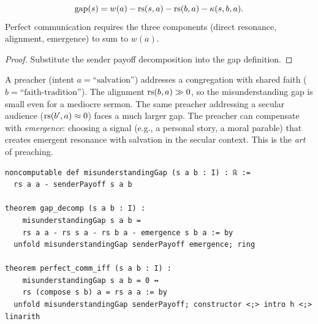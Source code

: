 \begin{theorem}
\label{thm:misunderstanding-emergence}
\[
\mathrm{gap}(s) = w(a) - \mathrm{rs}(s, a) - \mathrm{rs}(b, a) - \kappa(s, b, a).
\]
Perfect communication requires the three components (direct resonance,
alignment, emergence) to sum to $w(a)$.
\end{theorem}

\begin{proof}
Substitute the sender payoff decomposition into the gap definition.
\end{proof}

\begin{example}
A preacher (intent $a = \text{``salvation''}$) addresses a congregation with
shared faith ($b = \text{``faith-tradition''}$). The alignment
$\mathrm{rs}(b, a) \gg 0$, so the misunderstanding gap is small even for a mediocre
sermon. The same preacher addressing a secular audience
($\mathrm{rs}(b', a) \approx 0$) faces a much larger gap. The preacher can
compensate with \emph{emergence}: choosing a signal (e.g., a personal
story, a moral parable) that creates emergent resonance with salvation
in the secular context. This is the \emph{art} of preaching.
\end{example}

\begin{lstlisting}[caption={Lean 4: Misunderstanding gap}]
noncomputable def misunderstandingGap (s a b : I) : ℝ :=
  rs a a - senderPayoff s a b

theorem gap_decomp (s a b : I) :
    misunderstandingGap s a b =
    rs a a - rs s a - rs b a - emergence s b a := by
  unfold misunderstandingGap senderPayoff emergence; ring

theorem perfect_comm_iff (s a b : I) :
    misunderstandingGap s a b = 0 ↔
    rs (compose s b) a = rs a a := by
  unfold misunderstandingGap senderPayoff; constructor <;> intro h <;> linarith
\end{lstlisting}

